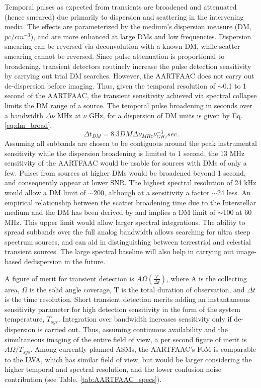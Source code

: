 \documentclass{aa}
\begin{document}
Temporal pulses as expected from  transients are broadened and attenuated (hence
smeared)  due  primarily  to   dispersion  and  scattering  in  the  intervening
media. The  effects are  parameterized by the  medium's dispersion  measure (DM,
$pc/cm^{-3}$),    and   are    more   enhanced    at   large    DMs    and   low
frequencies. Dispersion smearing can be  reversed via deconvolution with a known
DM,  while scatter  smearing cannot  be  reversed.  Since  pulse attenuation  is
proportional  to broadening,  transient detectors  routinely increase  the pulse
detection sensitivity by carrying out  trial DM searches.  However, the AARTFAAC
does  not carry  out de-dispersion  before  imaging.  Thus,  given the  temporal
resolution of $\sim$0.1  to 1 second of the  AARTFAAC, the transient sensitivity
achieved via  spectral collapse limits the  DM range of a  source.  The temporal
pulse broadening in seconds over a bandwidth $\Delta\nu$ MHz at $\nu$ GHz, for a
dispersion of DM units is given by Eq. \ref{eq:dm_broad}.
\begin{equation}
\Delta t_{DM}=8.3DM\Delta\nu_{MHz}\nu_{GHz}^{-3} sec.\label{eq:dm_broad}
\end{equation}
Assuming all subbands  are chosen to be contiguous  around the peak instrumental
sensitivity while the  dispersion broadening is limited to 1  second, the 13 MHz
sensitivity  of the AARTFAAC  would be  usable for  sources with  DMs of  only a
few. Pulses from  sources at higher DMs would be broadened  beyond 1 second, and
consequently appear  at lower  SNR.  The highest  spectral resolution of  24 kHz
would allow a DM limit of $\sim$200, although at a sensitivity a factor $\sim$24
less.  An empirical relationship between  the scatter broadening time due to the
Interstellar     medium     and    the     DM     has     been    derived     by
\citep{bhat2004multifrequency}  and  implies  a  DM  limit of  $\sim$100  at  60
MHz. This upper  limit would allow larger spectral  integrations. The ability to
spread subbands over the full  analog bandwidth allows searching for ultra steep
spectrum  sources,  and  can  aid  in  distinguishing  between  terrestrial  and
celestial  transient sources.   The large  spectral baseline  will also  help in
carrying out image-based dedispersion in the future.

A   figure  of   merit  for   transient   detection\citep{cordes2004dynamic}  is
$A\Omega\left(\frac{T}{\Delta  t}\right)$,  where  A  is  the  collecting  area,
$\Omega$ is  the solid angle coverage,  T is the total  duration of observation,
and $\Delta t$  is the time resolution. Short  transient detection merits adding
an  instantaneous sensitivity parameter  for high  detection sensitivity  in the
form of the system  temperature, $T_{sys}$. Integration over bandwidth increases
sensitivity  only if de-dispersion  is carried  out.  Thus,  assuming continuous
availability and  the simultaneous imaging  of the entire  field of view,  a per
second figure of  merit is $A\Omega/T_{sys}$. Among currently  planned ASMs, the
AARTFAAC's FoM  is comparable to the LWA,  which has similar field  of view, but
would be larger considering the higher temporal and spectral resolution, and the
lower confusion noise contribution (see Table. \ref{tab:AARTFAAC_specs}).
\end{document}
